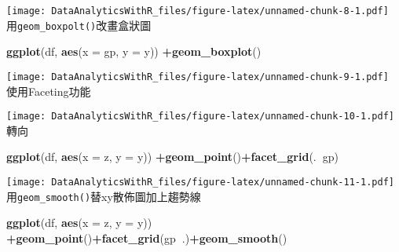 \documentclass[
]{book}
\newenvironment{Shaded}{\begin{snugshade}}{\end{snugshade}}
\newcommand{\DataTypeTok}[1]{\textcolor[rgb]{0.13,0.29,0.53}{#1}}
\newcommand{\DecValTok}[1]{\textcolor[rgb]{0.00,0.00,0.81}{#1}}
\newcommand{\KeywordTok}[1]{\textcolor[rgb]{0.13,0.29,0.53}{\textbf{#1}}}
\newcommand{\NormalTok}[1]{#1}
\newcommand{\OperatorTok}[1]{\textcolor[rgb]{0.81,0.36,0.00}{\textbf{#1}}}
\begin{document}
\texttt{[image: DataAnalyticsWithR\_files/figure-latex/unnamed-chunk-8-1.pdf]}
用\texttt{geom\_boxpolt()}改畫盒狀圖

\begin{Shaded}
\begin{Highlighting}[]
\KeywordTok{ggplot}\NormalTok{(df, }\KeywordTok{aes}\NormalTok{(}\DataTypeTok{x =}\NormalTok{ gp, }\DataTypeTok{y =}\NormalTok{ y)) }\OperatorTok{+}\KeywordTok{geom_boxplot}\NormalTok{()}
\end{Highlighting}
\end{Shaded}

\texttt{[image: DataAnalyticsWithR\_files/figure-latex/unnamed-chunk-9-1.pdf]}
使用Faceting功能

\begin{Shaded}
\end{Shaded}

\texttt{[image: DataAnalyticsWithR\_files/figure-latex/unnamed-chunk-10-1.pdf]}
轉向

\begin{Shaded}
\begin{Highlighting}[]
\KeywordTok{ggplot}\NormalTok{(df, }\KeywordTok{aes}\NormalTok{(}\DataTypeTok{x =}\NormalTok{ z, }\DataTypeTok{y =}\NormalTok{ y)) }\OperatorTok{+}\KeywordTok{geom_point}\NormalTok{()}\OperatorTok{+}\KeywordTok{facet_grid}\NormalTok{(.}\OperatorTok{~}\NormalTok{gp)}
\end{Highlighting}
\end{Shaded}

\texttt{[image: DataAnalyticsWithR\_files/figure-latex/unnamed-chunk-11-1.pdf]}
用\texttt{geom\_smooth()}替xy散佈圖加上趨勢線

\begin{Shaded}
\begin{Highlighting}[]
\KeywordTok{ggplot}\NormalTok{(df, }\KeywordTok{aes}\NormalTok{(}\DataTypeTok{x =}\NormalTok{ z, }\DataTypeTok{y =}\NormalTok{ y)) }\OperatorTok{+}\KeywordTok{geom_point}\NormalTok{()}\OperatorTok{+}\KeywordTok{facet_grid}\NormalTok{(gp}\OperatorTok{~}\NormalTok{.)}\OperatorTok{+}\KeywordTok{geom_smooth}\NormalTok{()}
\end{Highlighting}
\end{Shaded}
\end{document}
